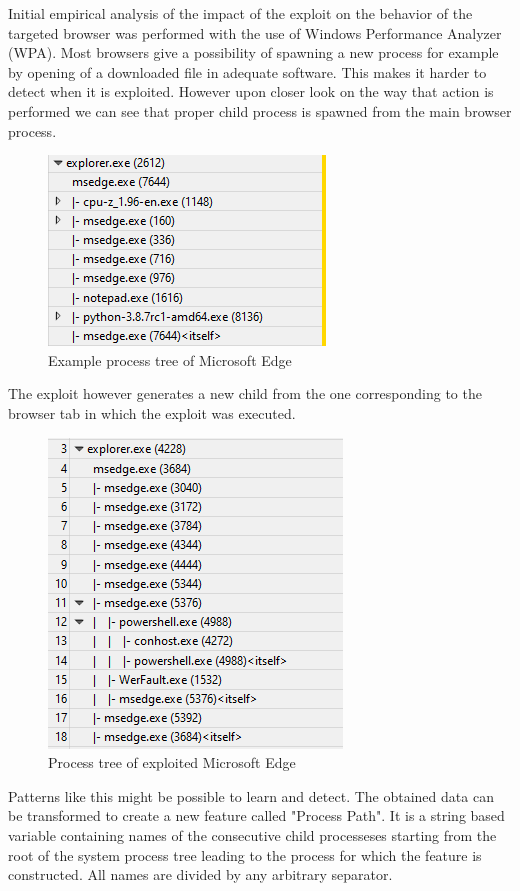 \documentclass[a4paper,twoside,12pt]{book}
\begin{document}
Initial empirical analysis of the impact of the exploit on the behavior of the targeted browser was 
performed with the use of Windows Performance Analyzer (WPA).  Most browsers give a 
possibility of spawning a new process for example by opening of a downloaded file in 
adequate software. This makes it harder to detect when it is exploited. However upon 
closer look on the way that action is performed we can see that proper child process is 
spawned from the main browser process.

\begin{figure}
	\centering
	\includegraphics{images/wpa_normal}
	\caption{Example process tree of Microsoft Edge}
	\label{fig:WPAnormal}
 \end{figure}

The exploit however generates a new child from the one corresponding to the browser tab 
in which the exploit was executed. 

\begin{figure}
	\centering
	\includegraphics{images/wpa_exploit}
	\caption{Process tree of exploited Microsoft Edge}
	\label{fig:WPAexploit}
 \end{figure}

Patterns like this might be possible to learn and detect. The obtained data can be transformed
to create a new feature called "Process Path". It is a string based variable containing names 
of the consecutive child processeses starting from the root of the system process tree leading to the 
process for which the feature is constructed. All names are divided by any arbitrary separator. 
\end{document}

